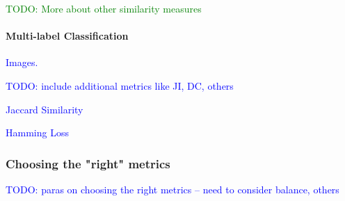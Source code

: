 \textcolor{green}{TODO: More about other similarity measures}




\paragraph{Multi-label Classification}

\textcolor{blue}{Images.}

\textcolor{blue}{TODO: include additional metrics like JI, DC, others}

\textcolor{blue}{Jaccard Similarity}

\textcolor{blue}{Hamming Loss}





\subsubsection{Choosing the "right" metrics}

\textcolor{blue}{TODO: paras on choosing the right metrics -- need to consider balance, others}



